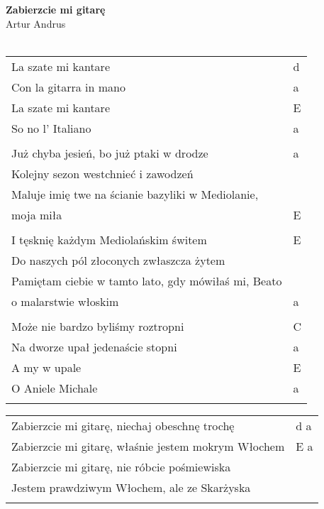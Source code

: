 \documentclass[a5paper]{article}
\begin{document}


\noindent
\fontsize{12pt}{15pt}\selectfont
\textbf{Zabierzcie mi gitarę} \\
\fontsize{8pt}{10pt}\selectfont
Artur Andrus \\ \\
\fontsize{10pt}{12pt}\selectfont
{}
\begin{tabular}{@{}p{9.5cm}p{3cm}@{}}
\noindent
La szate mi kantare & d \\
Con la gitarra in mano & a \\
La szate mi kantare & E \\
So no l' Italiano & a \\ \\

Już chyba jesień, bo już ptaki w drodze	& a \\
Kolejny sezon westchnieć i zawodzeń \\
Maluje imię twe na ścianie bazyliki w Mediolanie, \\
moja miła & E \\ \\

I tęsknię każdym Mediolańskim świtem & E \\
Do naszych pól złoconych zwłaszcza żytem \\
Pamiętam ciebie w tamto lato, gdy mówiłaś mi, Beato \\
o malarstwie włoskim & a \\ \\

Może nie bardzo byliśmy roztropni & C \\
Na dworze upał jedenaście stopni & a \\
A my w upale & E \\
O Aniele Michale & a \\ \\
\end{tabular}

\noindent
\begin{tabular}{@{}p{8.5cm}p{3cm}@{}}
Zabierzcie mi gitarę, niechaj obeschnę trochę & d a \\
Zabierzcie mi gitarę, właśnie jestem mokrym Włochem	& E a \\
Zabierzcie mi gitarę, nie róbcie pośmiewiska \\
Jestem prawdziwym Włochem, ale ze Skarżyska \\ \\
\end{tabular}
\end{document}
